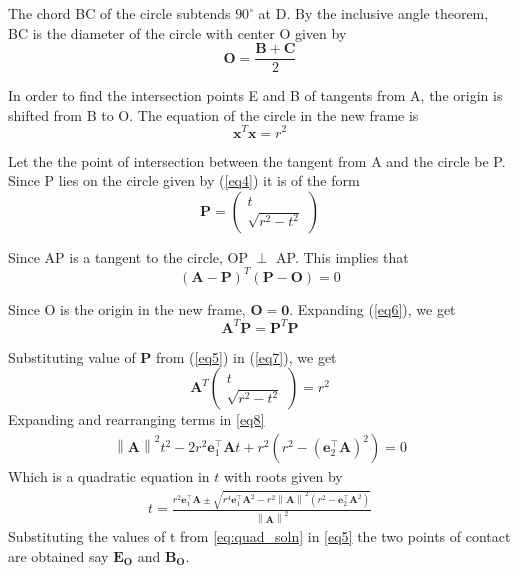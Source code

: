 \documentclass[journal,10pt,twocolumn]{article}
\providecommand{\norm}[1]{\left\lVert#1\right\rVert}
\let\vec\mathbf
\newcommand{\myvec}[1]{\ensuremath{\begin{pmatrix}#1\end{pmatrix}}}
\begin{document}
The chord BC of the circle subtends $90^\circ$ at D. By the inclusive angle theorem, BC is the diameter of the circle with center O given by
\begin{equation}
\vec{O} = \frac{\vec{B}+\vec{C}}{2}
\label{eq3}
\end{equation}

In order to find the intersection points E and B of tangents from A, the origin is shifted from B to O. The equation of the circle in the new frame is
\begin{equation}
	\vec{x}^T\vec{x} = r^2
	\label{eq4}
\end{equation}

Let the the point of intersection between the tangent from A and the circle be P. Since P lies on the circle given by (\ref{eq4}) it is of the form    
\begin{equation}
	\vec{P} = \myvec{t \\ \sqrt{r^2-t^2}}
	\label{eq5}
\end{equation}

Since AP is a tangent to the circle, OP $\perp$ AP. This implies that
\begin{equation}
	(\vec{A}-\vec{P})^T(\vec{P}-\vec{O}) = 0
	\label{eq6}
\end{equation}

Since O is the origin in the new frame, $\vec{O} = \vec{0}$. Expanding (\ref{eq6}), we get 
\begin{equation}
	\vec{A}^T\vec{P} = \vec{P}^T\vec{P}
	\label{eq7}
\end{equation}

Substituting value of $\vec{P}$ from (\ref{eq5}) in (\ref{eq7}), we get
\begin{equation}
	\vec{A}^T\myvec{t \\ \sqrt{r^2-t^2}} = r^2	
	\label{eq8}
\end{equation}
Expanding and rearranging terms in \eqref{eq8}
\begin{multline}
	\norm{\vec{A}}^2t^2-2r^2\vec{e}_1^\top\vec{A}t+r^2(r^2-(\vec{e}_2^\top\vec{A})^2) = 0
	\label{eq:quad_t}
\end{multline}
Which is a quadratic equation in $t$ with roots given by
\begin{align}
	t = \frac{r^2\vec{e}_1^\top\vec{A}\pm\sqrt{r^4\vec{e}_1^\top\vec{A}^2-r^2\norm{\vec{A}}^2(r^2-\vec{e}_2^\top\vec{A}^2)}}{\norm{\vec{A}}^2}
	\label{eq:quad_soln}
\end{align}
Substituting the values of t from \eqref{eq:quad_soln} in \eqref{eq5} the two points of contact are obtained say $\vec{E_O}$ and $\vec{B_O}$.\\
\end{document}
